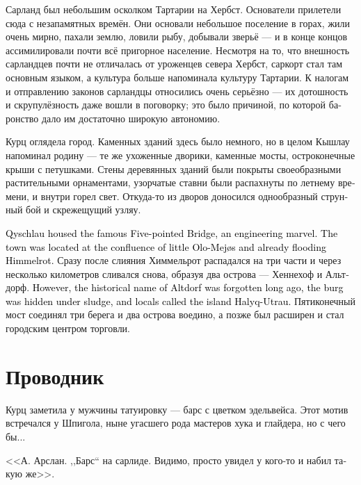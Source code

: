 \documentclass[a4paper,12pt,fleqn]{book}\usepackage{cooltooltips}\usepackage{polyglossia}\setdefaultlanguage[babelshorthands=true]{russian}\setotherlanguage{english}\defaultfontfeatures{Ligatures=TeX,Mapping=tex-text} \usepackage{xcolor}\definecolor{lightgray}{HTML}{bbbbbb}\color{lightgray}\newcommand{\ml}[3]{\textenglish{\textcolor{black}{#3}}}
\begin{document}
Сарланд был небольшим осколком Тартарии на Хербст.
Основатели прилетели сюда с незапамятных времён.
Они основали небольшое поселение в горах, жили очень мирно, пахали землю, ловили рыбу, добывали зверьё --- и в конце концов ассимилировали почти всё пригорное население.
Несмотря на то, что внешность сарландцев почти не отличалась от уроженцев севера Хербст, саркорт стал там основным языком, а культура больше напоминала культуру Тартарии.
К налогам и отправлению законов сарландцы относились очень серьёзно --- их дотошность и скрупулёзность даже вошли в поговорку;
это было причиной, по которой баронство дало им достаточно широкую автономию.

Курц оглядела город.
Каменных зданий здесь было немного, но в целом Кышлау напоминал родину --- те же ухоженные дворики, каменные мосты, остроконечные крыши с петушками.
Стены деревянных зданий были покрыты своеобразными растительными орнаментами, узорчатые ставни были распахнуты по летнему времени, и внутри горел свет.
Откуда-то из дворов доносился однообразный струнный бой и скрежещущий узляу.

\ml{$0$}
{В Кышлау находился знаменитый Пятиконечный мост --- чудо инженерного искусства.}
{Qyschlau housed the famous Five-pointed Bridge, an engineering marvel.}
\ml{$0$}
{Город находился в месте слияния маленького Оло-Мейяса и успевшего стать полноводным Химмельрота.}
{The town was located at the confluence of little Olo-Mej\o{}s and already flooding Himmelrot.}
Сразу после слияния Химмельрот распадался на три части и через несколько километров сливался снова, образуя два острова --- Хеннехоф и Альтдорф.
\ml{$0$}
{Впрочем, историческое название Альтдорфа давно забыли, городище скрылось под слоем ила, и местные называли его Хазлык-Утрау.}
{However, the historical name of Altdorf was forgotten long ago, the burg was hidden under sludge, and locals called the island Ha\dh{}lyq-Utrau.}
Пятиконечный мост соединял три берега и два острова воедино, а позже был расширен и стал городским центром торговли.

\section{Проводник}

Курц заметила у мужчины татуировку --- барс с цветком эдельвейса.
Этот мотив встречался у Шпигола, ныне угасшего рода мастеров хука и глайдера, но с чего бы...

<<А.
Арслан.
,,Барс`` на сарлиде.
Видимо, просто увидел у кого-то и набил такую же>>.
\end{document}
